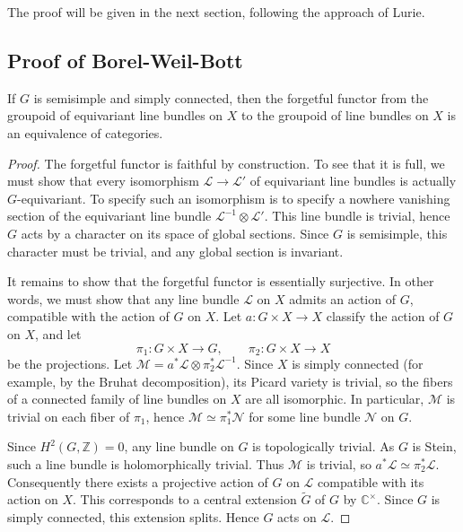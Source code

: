 \documentclass[12pt]{article}
\begin{document}
The proof will be given in the next section, following the approach of Lurie.

\subsection{Proof of Borel-Weil-Bott}


\begin{theorem}
If $G$ is semisimple and simply connected, then the forgetful functor from the groupoid of equivariant line bundles on $X$ to the groupoid of line bundles on $X$ is an equivalence of categories.
\end{theorem}

\begin{proof}
The forgetful functor is faithful by construction. To see that it is full, we must show that every isomorphism $\mathcal L \to \mathcal L'$ of equivariant line bundles is actually $G$-equivariant. To specify such an isomorphism is to specify a nowhere vanishing section of the equivariant line bundle $\mathcal L^{-1} \otimes \mathcal L'$. This line bundle is trivial, hence $G$ acts by a character on its space of global sections. Since $G$ is semisimple, this character must be trivial, and any global section is invariant.

It remains to show that the forgetful functor is essentially surjective. In other words, we must show that any line bundle $\mathcal L$ on $X$ admits an action of $G$, compatible with the action of $G$ on $X$. Let $a : G \times X \to X$ classify the action of $G$ on $X$, and let
\[
\pi_1 : G \times X \to G, \qquad \pi_2 : G \times X \to X
\]
be the projections. Let $\mathcal M = a^*\mathcal L \otimes \pi_2^*\mathcal L^{-1}$. Since $X$ is simply connected (for example, by the Bruhat decomposition), its Picard variety is trivial, so the fibers of a connected family of line bundles on $X$ are all isomorphic. In particular, $\mathcal M$ is trivial on each fiber of $\pi_1$, hence $\mathcal M \simeq \pi_1^*\mathcal N$ for some line bundle $\mathcal N$ on $G$.

Since $H^2(G,\mathbb Z)=0$, any line bundle on $G$ is topologically trivial. As $G$ is Stein, such a line bundle is holomorphically trivial. Thus $\mathcal M$ is trivial, so $a^*\mathcal L \simeq \pi_2^*\mathcal L$. Consequently there exists a projective action of $G$ on $\mathcal L$ compatible with its action on $X$. This corresponds to a central extension $\widetilde G$ of $G$ by $\mathbb C^\times$. Since $G$ is simply connected, this extension splits. Hence $G$ acts on $\mathcal L$.
\end{proof}
\end{document}
